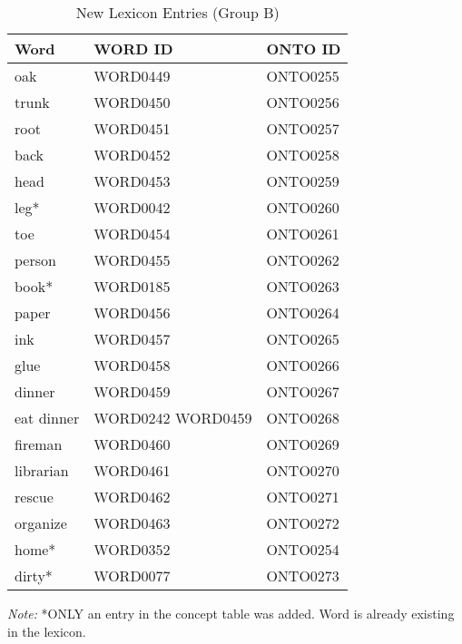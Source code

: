 \begin{table}[H]   %
\centering
\caption{New Lexicon Entries (Group B)} \vspace{0.25em}
\begin{tabular}{|l|l|l|} \hline
\textbf{Word} & \textbf{WORD ID} & \textbf{ONTO ID} \\ \hline
oak & WORD0449 & ONTO0255 \\ \hline
trunk & WORD0450 & ONTO0256 \\ \hline
root & WORD0451 & ONTO0257 \\ \hline
back & WORD0452 & ONTO0258 \\ \hline
head & WORD0453 & ONTO0259 \\ \hline
leg* & WORD0042 & ONTO0260 \\ \hline
toe & WORD0454 & ONTO0261 \\ \hline
person & WORD0455 & ONTO0262 \\ \hline
book* & WORD0185 & ONTO0263 \\ \hline
paper & WORD0456 & ONTO0264 \\ \hline
ink & WORD0457 & ONTO0265 \\ \hline
glue & WORD0458 & ONTO0266 \\ \hline
dinner & WORD0459 & ONTO0267 \\ \hline
eat dinner & WORD0242 WORD0459 & ONTO0268 \\ \hline
fireman & WORD0460 & ONTO0269 \\ \hline
librarian & WORD0461 & ONTO0270 \\ \hline
rescue & WORD0462 & ONTO0271 \\ \hline
organize & WORD0463 & ONTO0272 \\ \hline
home* & WORD0352 & ONTO0254 \\ \hline
dirty* & WORD0077 & ONTO0273 \\ \hline
\end{tabular}
\label{tab:grpblex}
\end{table}

\textit{Note:}
*ONLY an entry in the concept table was added. Word is already existing in the lexicon.

